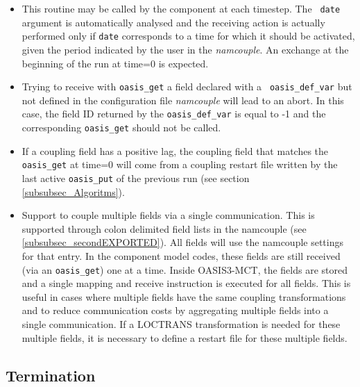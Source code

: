 \begin{itemize}

\item This routine may be called by the component at each timestep. The {\tt
  date} argument is automatically analysed and the receiving action is
actually performed only if {\tt date} corresponds to a time for which
it should be activated, given the period indicated by the user in the
{\it namcouple}. An exchange at the beginning of the run at time=0 is
expected.

\item Trying to receive with {\tt oasis\_get} a field declared with a {\tt
  oasis\_def\_var} but not defined in the configuration file {\it
  namcouple} will lead to an abort. In this case, the field ID
returned by the {\tt oasis\_def\_var} is equal to -1 and the
corresponding {\tt oasis\_get} should not be called. 

\item If a coupling field has a positive lag, the coupling field that
  matches the {\tt oasis\_get} at time=0 will come from a coupling
  restart file written by the last active {\tt oasis\_put} of the
  previous run (see section \ref{subsubsec_Algoritms}). 

\item Support to couple multiple fields via a single communication.
This is supported through colon delimited field lists in the namcouple (see \ref{subsubsec_secondEXPORTED}). 
All fields will use the namcouple settings for that entry. In the component
model codes, these fields are still received (via an {\tt oasis\_get}) one at a time. Inside
OASIS3-MCT, the fields are stored and a single mapping and receive instruction is executed
for all fields. This is useful in cases where multiple fields have the same coupling transformations
and to reduce communication costs by aggregating multiple fields into a single communication. If a
LOCTRANS transformation is needed for these multiple fields, it is necessary to define a restart file
for these multiple fields.
\end{itemize}

\subsection{Termination}
\label{subsubsec_Termination}

